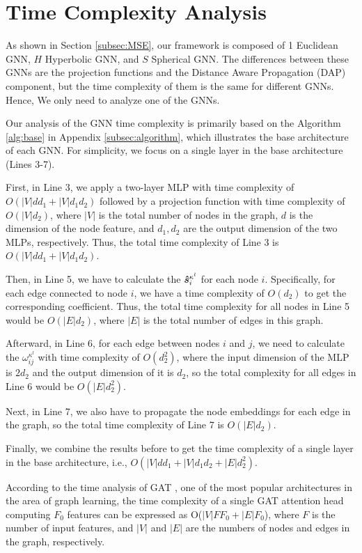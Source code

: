 \section{Time Complexity Analysis}
\label{subsec:time}
{\update As shown in Section \ref{subsec:MSE}, our framework is composed of 1 Euclidean GNN, $H$ Hyperbolic GNN, and $S$ Spherical GNN. The differences between these GNNs are the projection functions and the Distance Aware
Propagation (DAP) component, but the time complexity of them is the same for different GNNs. Hence, We only need to analyze one of the GNNs. 

Our analysis of the GNN time complexity is primarily based on the Algorithm \ref{alg:base} in Appendix \ref{subsec:algorithm}, which illustrates the base architecture of each GNN. For simplicity, we focus on a single layer in the base architecture (Lines 3-7). 

First, in Line 3, we apply a two-layer MLP with time complexity of $O(|V|dd_1+|V|d_1d_2)$ followed by a projection function with time complexity of $O(|V|d_2)$, where $|V|$ is the total number of nodes in the graph, $d$ is the dimension of the node feature, and $d_1, d_2$ are the output dimension of the two MLPs, respectively. Thus, the total time complexity of Line 3 is $O(|V|dd_1+|V|d_1d_2)$. 

Then, in Line 5, we have to calculate the $\boldsymbol{\hat{s}}_{i}^{\kappa^l}$ for each node $i$. Specifically, for each edge connected to node $i$, we have a time complexity of $O(d_2)$ to get the corresponding coefficient. Thus, the total time complexity for all nodes in Line 5 would be $O(|E|d_2)$, where $|E|$ is the total number of edges in this graph. 

Afterward, in Line 6, for each edge between nodes $i$ and $j$, we need to calculate the $\omega_{ij}^{\kappa^l}$ with time complexity of $O(d_2^2)$, where the input dimension of the MLP is $2d_2$ and the output dimension of it is $d_2$, so the total complexity for all edges in Line 6 would be $O(|E|d_2^2)$.

Next, in Line 7, we also have to propagate the node embeddings for each edge in the graph, so the total time complexity of Line 7 is $O(|E|d_2)$. 

Finally, we combine the results before to get the time complexity of a single layer in the base architecture, i.e., $O(|V|dd_1+|V|d_1d_2+|E|d_2^2)$. 

According to the time analysis of GAT \citep{gat18velickovic}, one of the most popular architectures in the area of graph learning, the time complexity of a single GAT attention head computing $F_0$ features can be expressed as O($|V|FF_0 + |E|F_0$), where $F$ is the number of input features, and $|V|$ and $|E|$ are the numbers of nodes and edges in the graph, respectively. 

}
